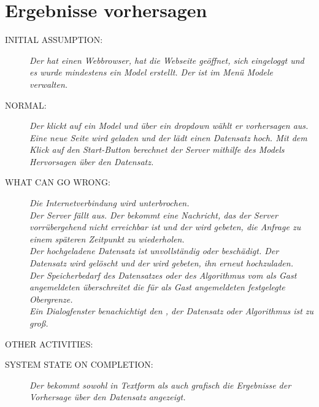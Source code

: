 \section{Ergebnisse vorhersagen}
\begin{description}
  \item [INITIAL ASSUMPTION:]
    \textit{Der  hat einen Webbrowser, hat die Webseite geöffnet, sich eingeloggt und es wurde mindestens ein \gls{Model} erstellt. Der  ist im Menü \gls{Model}e verwalten.}
  \item [NORMAL:]
    \textit{Der  klickt auf ein \gls{Model} und über ein \gls{dropdown} wählt er vorhersagen aus. Eine neue Seite wird geladen und der  lädt einen \gls{Datensatz} hoch. Mit dem Klick auf den Start-Button berechnet der Server mithilfe des \gls{Model}s Hervorsagen über den \gls{Datensatz}. }
  \item [WHAT CAN GO WRONG:]
    \textit{Die Internetverbindung wird unterbrochen.\\
Der Server fällt aus. Der  bekommt eine Nachricht, das der Server vorrübergehend nicht erreichbar ist und der  wird gebeten, die Anfrage zu einem späteren Zeitpunkt zu wiederholen.\\
Der hochgeladene \gls{Datensatz} ist unvollständig oder beschädigt. Der \gls{Datensatz} wird gelöscht und der  wird gebeten, ihn erneut hochzuladen.\\
Der Speicherbedarf des \gls{Datensatz}es oder des Algorithmus vom als \gls{Gast} angemeldeten  überschreitet die für als \gls{Gast} angemeldeten  festgelegte Obergrenze.\\ Ein Dialogfenster benachichtigt den , der \gls{Datensatz} oder Algorithmus ist zu groß.}
  \item [OTHER ACTIVITIES:]
    \textit{}
  \item [SYSTEM STATE ON COMPLETION:]
    \textit{Der  bekommt sowohl in Textform als auch grafisch die Ergebnisse der Vorhersage über den \gls{Datensatz} angezeigt.}
\end{description}

